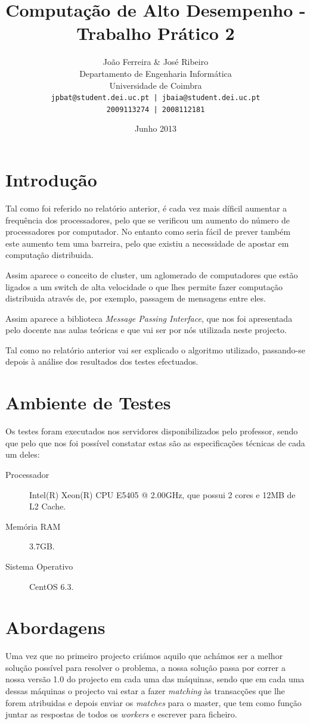 \documentclass[a4paper]{article}
\title{Computação de Alto Desempenho - Trabalho Prático 2}
\author{João Ferreira \& José Ribeiro\\
		Departamento de Engenharia Informática\\
		Universidade de Coimbra\\
		\texttt{jpbat@student.dei.uc.pt | jbaia@student.dei.uc.pt}\\
		\texttt{2009113274 | 2008112181}}
\date{Junho 2013}
\begin{document}
\maketitle

\clearpage

\tableofcontents
\clearpage

\setlength{\parindent}{1cm}
\setlength{\parskip}{0.3cm}

\section{Introdução}
\indent \indent Tal como foi referido no relatório anterior, é cada vez mais díficil aumentar a frequência dos processadores, pelo que se verificou um aumento do número de processadores por computador. No entanto como seria fácil de prever também este aumento tem uma barreira, pelo que existiu a necessidade de apostar em computação distribuida.

Assim aparece o conceito de cluster, um aglomerado de computadores que estão ligados a um switch de alta velocidade o que lhes permite fazer computação distribuida através de, por exemplo, passagem de mensagens entre eles.

Assim aparece a biblioteca \textit{Message Passing Interface}, que nos foi apresentada pelo docente nas aulas teóricas e que vai ser por nós utilizada neste projecto.

Tal como no relatório anterior vai ser explicado o algoritmo utilizado, passando-se depois à análise dos resultados dos testes efectuados.
\clearpage


\section{Ambiente de Testes}
\indent \indent Os testes foram executados nos servidores disponibilizados pelo professor, sendo que pelo que nos foi possível constatar estas são as especificações técnicas de cada um deles:
\begin{description}
	\item [Processador] Intel(R) Xeon(R) CPU E5405 @ 2.00GHz, que possui 2 cores e 12MB de L2 Cache.
	\item [Memória RAM] 3.7GB.
	\item [Sistema Operativo] CentOS 6.3.
\end{description}

\section{Abordagens}
\indent \indent Uma vez que no primeiro projecto criámos aquilo que achámos ser a melhor solução possível para resolver o problema, a nossa solução passa por correr a nossa versão 1.0 do projecto em cada uma das máquinas, sendo que em cada uma dessas máquinas o projecto vai estar a fazer \textit{matching} às transacções que lhe forem atribuidas e depois enviar os \textit{matches} para o master, que tem como função juntar as respostas de todos os \textit{workers} e escrever para ficheiro.
\end{document}
